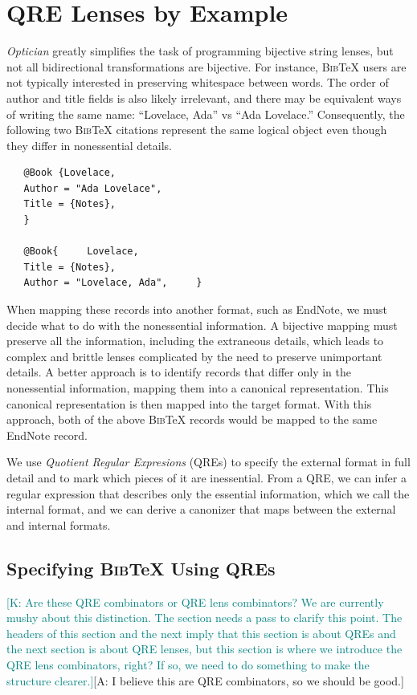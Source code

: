 \documentclass[acmsmall,review,anonymous]{acmart}
\newcommand{\FINISH}[3]{\ifdraft\textcolor{#1}{[#2: #3]}\fi}
\newcommand{\afm}[1]{\FINISH{dkgreen}{A}{#1}}
\newcommand{\ksf}[1]{\FINISH{teal}{K}{#1}}
\newcommand{\bibtex}{\textsc{Bib}\TeX{}}
\begin{document}
\section{QRE Lenses by Example}
\label{sec:example}

{\em Optician} greatly simplifies the task of programming bijective
string lenses, but not all bidirectional transformations are
bijective.  For instance, \bibtex{} users are not typically interested
in preserving whitespace between words.  The order of author and title
fields is also likely irrelevant, and there may be equivalent ways of
writing the same name: ``Lovelace, Ada'' vs ``Ada Lovelace.''
Consequently, the following two \bibtex{} citations represent the same
logical object even though they differ in nonessential details.
\begin{verbatim}
   @Book {Lovelace,
   Author = "Ada Lovelace",
   Title = {Notes},
   }

   @Book{     Lovelace,
   Title = {Notes},
   Author = "Lovelace, Ada",     }
\end{verbatim}

When mapping these records into another format, such as EndNote, we
must decide what to do with the nonessential information.  A bijective
mapping must preserve all the information, including the extraneous
details, which leads to complex and brittle lenses complicated by the
need to preserve unimportant details.  
A better approach is to identify records that differ only in the
nonessential information, mapping them into a canonical representation.
This canonical representation is then mapped into the target format.
With this approach, both of the above \bibtex{} records would be
mapped to the same EndNote record.

We use {\em Quotient Regular Expresions} (QREs) to specify the
external format in full detail and to mark which pieces of it are
inessential.  From a QRE, we can infer a regular expression that
describes only the essential information, which we call the internal
format, and we can derive a canonizer that maps between the external
and internal formats.


\subsection{Specifying \bibtex{} Using QREs}
\label{subsec:qre-expressions}
\ksf{Are these QRE combinators or QRE lens combinators?  
We are currently mushy about this distinction.  
The section needs a pass to clarify this point.
The headers of this section and the next imply that this section is
about QREs and the next section is about QRE lenses, but this section
is where we introduce the QRE lens combinators, right?  If so, we need
to do something to make the structure clearer.}\afm{I believe this are QRE
combinators, so we should be good.}
\end{document}
